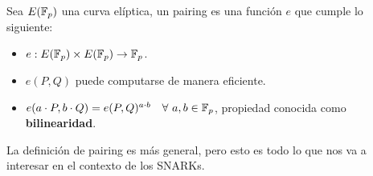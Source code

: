 \vspace{1em}

Sea $E(\mathbb{F}_p)$ una curva elíptica, un pairing es una función $e$ que cumple lo siguiente:
\begin{itemize}
    \item $e: E(\mathbb{F}_p) \times E(\mathbb{F}_p) \rightarrow \mathbb{F}_p$.
    \item $e(P,Q)$ puede computarse de manera eficiente.
    \item $e(a\cdot P, b\cdot Q) = e(P,Q)^{a\cdot b} ~~~ \forall~a,b\in  \mathbb{F}_p$, propiedad conocida como \textbf{bilinearidad}. 
\end{itemize}

La definición de pairing es más general, pero esto es todo lo que nos va a interesar en el contexto de los SNARKs. 

